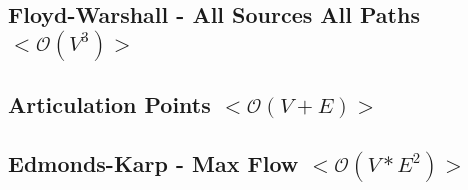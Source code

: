 \documentclass[10pt, a4paper, twoside, notitlepage]{article}
\begin{document}


\subsection{Floyd-Warshall - All Sources All Paths $<\mathcal{O}(V^{3})>$}



\newpage

\subsection{Articulation Points $<\mathcal{O}(V+E)>$}



\newpage

\subsection{Edmonds-Karp - Max Flow $<\mathcal{O}(V*E^{2})>$}



\newpage
\end{document}
